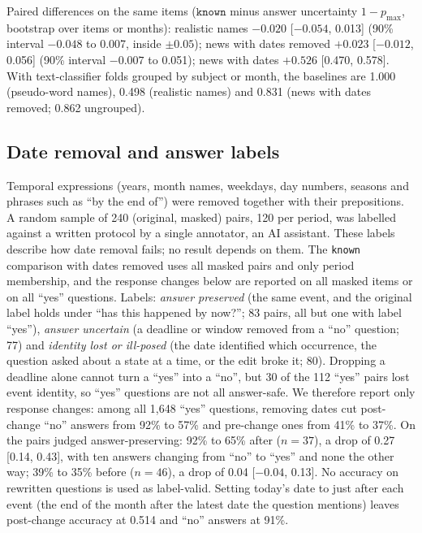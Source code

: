 \documentclass[10pt,twocolumn]{article}
\newcommand{\pmax}{p_{\max}}
\begin{document}
Paired differences on the same items ($\texttt{known}$ minus answer uncertainty $1-\pmax$,
bootstrap over items or months): realistic names $-0.020$ [$-0.054$, 0.013]
(90\% interval $-0.048$ to 0.007, inside $\pm0.05$); news with dates removed
$+0.023$ [$-0.012$, 0.056] (90\% interval $-0.007$ to 0.051); news with dates
$+0.526$ [0.470, 0.578]. With text-classifier folds grouped by subject or month,
the baselines are 1.000 (pseudo-word names), 0.498 (realistic names) and 0.831
(news with dates removed; 0.862 ungrouped).

\subsection{Date removal and answer labels}
\label{app:dates}

Temporal expressions (years, month names, weekdays, day numbers, seasons and
phrases such as ``by the end of'') were removed together with their
prepositions. A random sample of 240 (original, masked) pairs, 120 per period,
was labelled against a written protocol by a single annotator, an AI
assistant. These labels describe how date removal fails; no result depends on
them. The \texttt{known} comparison with dates removed uses all masked pairs
and only period membership, and the response changes below are reported on
all masked items or on all ``yes'' questions. Labels: \emph{answer
preserved} (the same event, and the original label holds under ``has this
happened by now?''; 83 pairs, all but one with label ``yes''), \emph{answer
uncertain} (a deadline or window removed from a ``no'' question; 77) and
\emph{identity lost or ill-posed} (the date identified which occurrence, the
question asked about a state at a time, or the edit broke it; 80). Dropping a
deadline alone cannot turn a ``yes'' into a ``no'', but 30 of the 112 ``yes''
pairs lost event identity, so ``yes'' questions are not all answer-safe. We
therefore report only response changes: among all 1{,}648 ``yes'' questions,
removing dates cut post-change ``no'' answers from 92\% to 57\% and pre-change
ones from 41\% to 37\%. On the pairs judged answer-preserving: 92\% to 65\%
after ($n=37$), a drop of 0.27 [0.14, 0.43], with ten answers changing from
``no'' to ``yes'' and none the other way; 39\% to 35\% before ($n=46$), a drop of
0.04 [$-0.04$, 0.13]. No accuracy on rewritten questions is used as label-valid. Setting today's date to just
after each event (the end of the month after the latest date the question
mentions) leaves post-change accuracy at 0.514 and ``no'' answers at 91\%.
\end{document}
